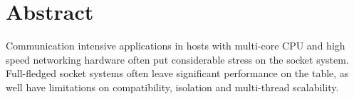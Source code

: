 \section*{Abstract}

Communication intensive applications in hosts with multi-core CPU and high speed networking hardware often put considerable stress on the socket system.
Full-fledged socket systems often leave significant performance on the table, as well have limitations on compatibility, isolation and multi-thread scalability.



